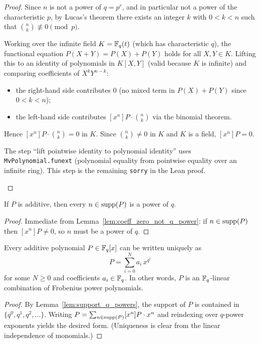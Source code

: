 \begin{proof}
  Since $n$ is not a power of $q = p^r$, and in particular not a power of the
  characteristic $p$, by Lucas's theorem there exists an integer $k$ with
  $0 < k < n$ such that $\binom{n}{k} \not\equiv 0 \pmod{p}$.

  Working over the infinite field $K = \mathbb{F}_q(t)$ (which has characteristic $q$),
  the functional equation $P(X+Y) = P(X)+P(Y)$ holds for all $X, Y \in K$.
  Lifting this to an identity of polynomials in $K[X,Y]$ (valid because $K$ is
  infinite) and comparing coefficients of $X^k Y^{n-k}$:
  \begin{itemize}
    \item the right-hand side contributes $0$ (no mixed term in $P(X)+P(Y)$
          since $0 < k < n$);
    \item the left-hand side contributes $[x^n]P \cdot \binom{n}{k}$ via the
          binomial theorem.
  \end{itemize}
  Hence $[x^n]P \cdot \binom{n}{k} = 0$ in $K$.
  Since $\binom{n}{k} \neq 0$ in $K$ and $K$ is a field, $[x^n]P = 0$.

  \begin{remark}
    The step ``lift pointwise identity to polynomial identity'' uses
    \texttt{MvPolynomial.funext} (polynomial equality from pointwise equality
    over an infinite ring).  This step is the remaining \texttt{sorry} in the
    Lean proof.
  \end{remark}
\end{proof}

\begin{lemma}
  \label{lem:support_q_powers}
  \leanok
  If $P$ is additive, then every $n \in \operatorname{supp}(P)$ is a power of $q$.
\end{lemma}

\begin{proof}
  \leanok
  Immediate from Lemma~\ref{lem:coeff_zero_not_q_power}: if $n \in \operatorname{supp}(P)$
  then $[x^n]P \neq 0$, so $n$ must be a power of $q$.
\end{proof}

\begin{theorem}
  \label{thm:additive_structure}
  Every additive polynomial $P \in \mathbb{F}_q[x]$ can be written uniquely as
  \[
    P = \sum_{i=0}^{N} a_i \, x^{q^i}
  \]
  for some $N \geq 0$ and coefficients $a_i \in \mathbb{F}_q$.
  In other words, $P$ is an $\mathbb{F}_q$-linear combination of Frobenius power polynomials.
\end{theorem}

\begin{proof}
  By Lemma~\ref{lem:support_q_powers}, the support of $P$ is contained in
  $\{q^0, q^1, q^2, \ldots\}$.
  Writing $P = \sum_{n \in \operatorname{supp}(P)} [x^n]P \cdot x^n$ and reindexing over
  $q$-power exponents yields the desired form.
  (Uniqueness is clear from the linear independence of monomials.)
\end{proof}